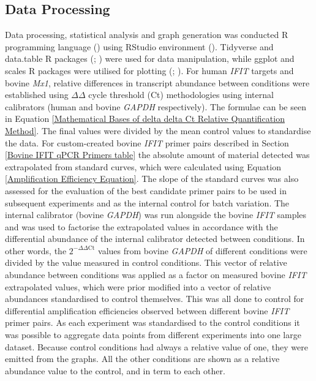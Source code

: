 \subsection{Data Processing} \label{Data Processing}
Data processing, statistical analysis and graph generation was conducted R programming language (\cite{RCoreTeam2022R:Computing}) using RStudio environment (\cite{RStudioTeam2022RStudio:RStudio}). Tidyverse and data.table R packages (\cite{Wickham2019WelcomeTidyverse}; \cite{Dowle2022Data.table:data.frame}) were used for data manipulation, while ggplot and scales R packages were utilised for plotting (\cite{Wickham2019WelcomeTidyverse}; \cite{Wickham2022Scales:Visualization}). For human \textit{IFIT} targets and bovine \textit{Mx1}, relative differences in transcript abundance between conditions were established using \(\Delta\)\(\Delta\) cycle threshold (Ct) methodologies using internal calibrators (human and bovine \textit{GAPDH} respectively). The formulae can be seen in Equation \ref{Mathematical Bases of delta delta Ct Relative Quantification Method}. The final values were divided by the mean control values to standardise the data. For custom-created bovine \textit{IFIT} primer pairs described in Section \ref{Bovine IFIT qPCR Primers table} the absolute amount of material detected was extrapolated from standard curves, which were calculated using Equation \ref{Amplification Efficiency Equation}. The slope of the standard curves was also assessed for the evaluation of the best candidate primer pairs to be used in subsequent experiments and as the internal control for batch variation. The internal calibrator (bovine \textit{GAPDH}) was run alongside the bovine \textit{IFIT} samples and was used to factorise the extrapolated values in accordance with the differential abundance of the internal calibrator detected between conditions. In other words, the \(2^{-\Delta\Delta \mbox{Ct}}\) values from bovine \textit{GAPDH} of different conditions were divided by the value measured in control conditions. This vector of relative abundance between conditions was applied as a factor on measured bovine \textit{IFIT} extrapolated values, which were prior modified into a vector of relative abundances standardised to control themselves. This was all done to control for differential amplification efficiencies observed between different bovine \textit{IFIT} primer pairs. As each experiment was standardised to the control conditions it was possible to aggregate data points from different experiments into one large dataset. Because control conditions had always a relative value of one, they were emitted from the graphs. All the other conditions are shown as a relative abundance value to the control, and in term to each other. 


